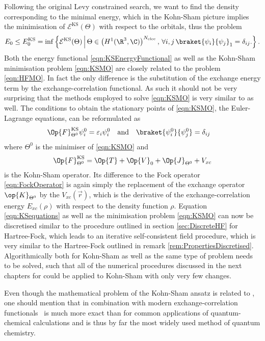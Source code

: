 Following the original Levy constrained search,
we want to find the density corresponding to the minimal energy,
which in the Kohn-Sham picture implies the minimisation
of $\mathcal{E}^\text{KS}(\Theta)$ with respect to the orbitals,
thus the problem
\begin{equation}
	E_0 \leq E_0^\text{KS}
	= \inf \left\{
		\mathcal{E}^\text{KS}(\Theta)
		\, \middle| \,
		\Theta \in \left(H^1(\R^3, \C)\right)^{\Nelec}, \,
		\forall i,j \,
		\braket{\psi_i}{\psi_j}_1 = \delta_{ij}.
	\right\}.
	\label{eqn:KSMO}
\end{equation}
Both the energy functional \eqref{eqn:KSEnergyFunctional}
as well as the Kohn-Sham minimisation problem \eqref{eqn:KSMO} are closely
related to the \HF problem \eqref{eqn:HFMO}.
In fact the only difference is the substitution of the exchange energy term
by the exchange-correlation functional.
As such it should not be very surprising that the methods employed to solve
\eqref{eqn:KSMO} is very similar to \HF as well.
The conditions to obtain the stationary points of \eqref{eqn:KSMO},
the Euler-Lagrange equations,
can be reformulated as
\begin{align}
	\label{eqn:KSequations}
	\Op{F}^\text{KS}_{\Theta^0} \psi_i^0 &= \varepsilon_i \psi_i^0
	&&\text{and}&
	\braket{\psi_i^0}{\psi_j^0} &= \delta_{ij}
\end{align}
where $\Theta^0$ is the minimiser of \eqref{eqn:KSMO} and
\begin{equation}
	\Op{F}_{\Theta^0}^\text{KS} = \Op{T} + \Op{V}_0 + \Op{J}_{\Theta^0} + V_{xc}
	\label{eqn:KohnShamOperator}
\end{equation}
is the Kohn-Sham operator.
Its difference to the Fock operator \eqref{eqn:FockOperator}
is again simply the replacement of the exchange operator $\op{K}_{\Theta^0}$
by the  $V_{xc}(\vec{r})$,
which is the derivative of the exchange-correlation energy $E_{xc}(\rho)$
with respect to the density function $\rho$.
Equation \eqref{eqn:KSequations} as well as the minimisation problem
\eqref{eqn:KSMO} can now be discretised
similar to the procedure outlined in section \vref{sec:DiscreteHF}
for Hartree-Fock,
which leads to an iterative self-consistent field procedure,
which is very similar to the Hartree-Fock \SCF outlined in
remark \vref{rem:PropertiesDiscretised}.
Algorithmically both for Kohn-Sham \DFT as well as \HF the same type of problem
needs to be solved, such that all of the numerical procedures
discussed in the next chapters for \HF could be applied to Kohn-Sham \DFT
with only very few changes.

Even though the mathematical problem of the Kohn-Sham \DFT ansatz is related
to \HF, one should mention that \DFT in combination with modern
exchange-correlation functionals~%
\cite{Tsuneda2014,Grimme2011,Perdew2005,Perdew1996,Becke1993,Lee1988}
is much more exact than \HF
for common applications of quantum-chemical calculations
and is thus by far the most widely used method of quantum chemistry.
